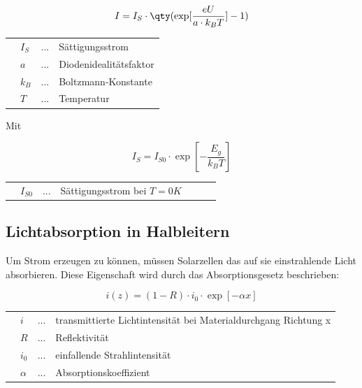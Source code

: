 \documentclass[slug=SZ, room=Hermann-Krone-Bau\,\ Labor\ 1.25, supervisor=Martin\ Kroll]{../../Lab_Report_LaTeX/lab_report}
\begin{document}
\begin{equation}\label{eq:shockley}
        I = I_S \cdot \qty(\exp[\frac{eU}{a \cdot k_B T}]-1)
\end{equation}

\begin{tabular}{llll}
         & \(I_S\) & ... & Sättigungsstrom        \\
         & \(a\)   & ... & Diodenidealitätsfaktor \\
         & \(k_B\) & ... & Boltzmann-Konstante    \\
         & \(T\)   & ... & Temperatur
\end{tabular}

\newpage

Mit

\begin{equation}\label{eq:sattigstrom}
        I_S = I_{S0} \cdot \exp[-\frac{E_g}{k_B T}]
\end{equation}

\begin{tabular}{lllllll}
         & \(I_{S0}\) & ... & Sättigungsstrom bei \(T=0 K\) &
\end{tabular}

\subsection{Lichtabsorption in Halbleitern}
\label{sec:absorp}

Um Strom erzeugen zu können, müssen Solarzellen das auf sie einstrahlende Licht absorbieren.
Diese Eigenschaft wird durch das Absorptionsgesetz beschrieben:

\begin{equation}\label{eq:absorp}
        i(z) = (1-R) \cdot i_0 \cdot \exp[-\alpha x]
\end{equation}

\begin{tabular}{llll}
         & \(i\)      & ... & transmittierte Lichtintensität bei Materialdurchgang Richtung x \\
         & \(R\)      & ... & Reflektivität                                                   \\
         & \(i_0\)    & ... & einfallende Strahlintensität                                    \\
         & \(\alpha\) & ... & Absorptionskoeffizient
\end{tabular}\\ \\
\end{document}
